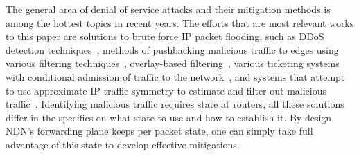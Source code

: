 The general area of denial of service attacks and their mitigation methods is among the hottest topics in recent years.
The efforts that are most relevant works to this paper are solutions to brute force IP packet flooding, such as DDoS detection techniques~\cite{Chen:2007:Collaborative-detection, Jun:2011:DDoS-flooding}, methods of pushbacking malicious traffic to edges using various filtering techniques~\cite{Pushback, Tupakula:2003:A-practical-method, Argyraki:2005:Active-internet, Oikonomou:2006:A-framework-for-a-collaborative, Liu:2008:To-filter-or-to-authorize:, Chou:2009:Proactive-surge, Liu:2010:NetFence:-preventing}, 
overlay-based filtering~\cite{Stone:2000:CenterTrack:-An-IP-overlay, Keromytis:2004:SOS:-An-architecture, Kline:2011:Shield:-DoS-filtering}, 
various ticketing systems with conditional admission of traffic to the network~\cite{Yaar:2004:SIFF:-A-stateless, Yang:2005:A-DoS-limiting-network, Wendlandt:2006:Fastpass:-Providing, Natu:2007:Fine-grained-capabilities, Portcullis, Capabilities},
and systems that attempt to use approximate IP traffic symmetry to estimate and filter out malicious traffic~\cite{Wang:2002:Detecting-SYN-flooding, Kreibich:2005:Using-packet, Mahimkar:2007:dFence:-Transparent}. Identifying malicious traffic requires state at routers, all these solutions differ in the specifics on what state to use and how to establish it.  By design NDN's forwarding plane keeps per packet state, one can simply take full advantage of this state to develop effective mitigations.
















